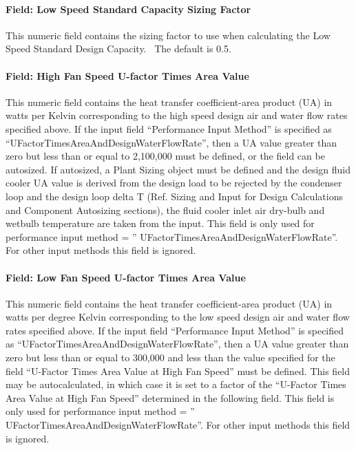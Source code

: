 \paragraph{Field: Low Speed Standard Capacity Sizing Factor}\label{field-low-speed-standard-capacity-sizing-factor}

This numeric field contains the sizing factor to use when calculating the Low Speed Standard Design Capacity.~ The default is 0.5.

\paragraph{Field: High Fan Speed U-factor Times Area Value}\label{field-high-fan-speed-u-factor-times-area-value-1}

This numeric field contains the heat transfer coefficient-area product (UA) in watts per Kelvin corresponding to the high speed design air and water flow rates specified above. If the input field ``Performance Input Method'' is specified as ``UFactorTimesAreaAndDesignWaterFlowRate'', then a UA value greater than zero but less than or equal to 2,100,000 must be defined, or the field can be autosized. If autosized, a Plant Sizing object must be defined and the design fluid cooler UA value is derived from the design load to be rejected by the condenser loop and the design loop delta T (Ref. Sizing and Input for Design Calculations and Component Autosizing sections), the fluid cooler inlet air dry-bulb and wetbulb temperature are taken from the input. This field is only used for performance input method = '' UFactorTimesAreaAndDesignWaterFlowRate''. For other input methods this field is ignored.

\paragraph{Field: Low Fan Speed U-factor Times Area Value}\label{field-low-fan-speed-u-factor-times-area-value-1}

This numeric field contains the heat transfer coefficient-area product (UA) in watts per degree Kelvin corresponding to the low speed design air and water flow rates specified above. If the input field ``Performance Input Method'' is specified as ``UFactorTimesAreaAndDesignWaterFlowRate'', then a UA value greater than zero but less than or equal to 300,000 and less than the value specified for the field ``U-Factor Times Area Value at High Fan Speed'' must be defined. This field may be autocalculated, in which case it is set to a factor of the ``U-Factor Times Area Value at High Fan Speed'' determined in the following field. This field is only used for performance input method = '' UFactorTimesAreaAndDesignWaterFlowRate''. For other input methods this field is ignored.

